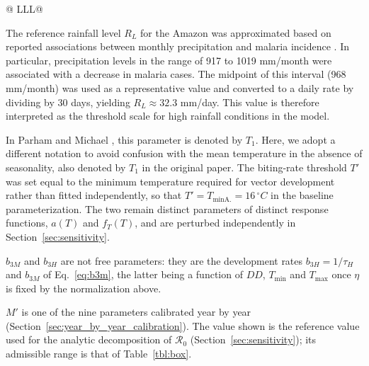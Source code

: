\documentclass[a4paper,fleqn]{cas-dc}
\begin{document}
\begin{table}[width=2.0\linewidth,cols=3,pos=h]
\begin{threeparttable}
\begin{tabular*}{\tblwidth}{@{} LLL@{} }
\bottomrule
\end{tabular*}
\begin{tablenotes}
\item[3] The reference rainfall level $R_L$ for the Amazon was approximated based on reported associations between monthly precipitation and malaria incidence \cite{Ecological_Change_Malaria_Risk}. In particular, precipitation levels in the range of 917 to 1019 mm/month were associated with a decrease in malaria cases. The midpoint of this interval (968 mm/month) was used as a representative value and converted to a daily rate by dividing by 30 days, yielding $R_L \approx 32.3$ mm/day. This value is therefore interpreted as the threshold scale for high rainfall conditions in the model.
\item[4] In Parham and Michael \cite{Parham2010}, this parameter is denoted by \(T_1\). Here, we adopt a different notation to avoid confusion with the mean temperature in the absence of seasonality, also denoted by \(T_1\) in the original paper. The biting-rate threshold $T'$ was set equal to the minimum temperature required for vector development rather than fitted independently, so that $T'=T_{\min\text{A.}}=16\,^{\circ}C$ in the baseline parameterization. The two remain distinct parameters of distinct response functions, $a(T)$ and $f_T(T)$, and are perturbed independently in Section~\ref{sec:sensitivity}.
\item[5] $b_{3M}$ and $b_{3H}$ are not free parameters: they are the development rates $b_{3H}=1/\tau_H$ and $b_{3M}$ of Eq.~\ref{eq:b3m}, the latter being a function of $DD$, $T_{\min}$ and $T_{\max}$ once $\eta$ is fixed by the normalization above.
\item[6] $M'$ is one of the nine parameters calibrated year by year (Section~\ref{sec:year_by_year_calibration}). The value shown is the reference value used for the analytic decomposition of $\mathcal{R}_0$ (Section~\ref{sec:sensitivity}); its admissible range is that of Table~\ref{tbl:box}.
\end{tablenotes}
\end{threeparttable}
\end{table}
\end{document}
